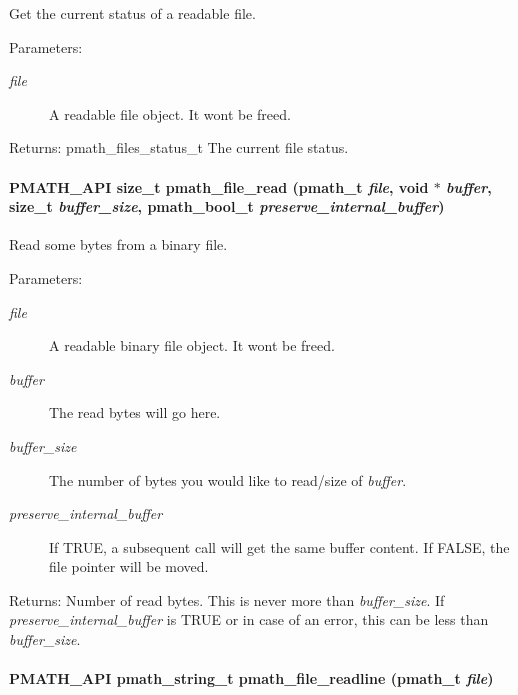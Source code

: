 Get the current status of a readable file. 

\begin{Desc}
\item[Parameters:]
\begin{description}
\item[{\em file}]A readable file object. It wont be freed. \end{description}
\end{Desc}
\begin{Desc}
\item[Returns:]pmath\_\-files\_\-status\_\-t The current file status. \end{Desc}
\hypertarget{group__file__api_g045e5eeb1b78c481c5479fc52ba3a402}{
\paragraph[{pmath\_\-file\_\-read}]{\setlength{\rightskip}{0pt plus 5cm}PMATH\_\-API size\_\-t pmath\_\-file\_\-read ({\bf pmath\_\-t} {\em file}, \/  void $\ast$ {\em buffer}, \/  size\_\-t {\em buffer\_\-size}, \/  {\bf pmath\_\-bool\_\-t} {\em preserve\_\-internal\_\-buffer})}\hfill}
\label{group__file__api_g045e5eeb1b78c481c5479fc52ba3a402}


Read some bytes from a binary file. 

\begin{Desc}
\item[Parameters:]
\begin{description}
\item[{\em file}]A readable binary file object. It wont be freed. \item[{\em buffer}]The read bytes will go here. \item[{\em buffer\_\-size}]The number of bytes you would like to read/size of {\em buffer\/}. \item[{\em preserve\_\-internal\_\-buffer}]If TRUE, a subsequent call will get the same buffer content. If FALSE, the file pointer will be moved. \end{description}
\end{Desc}
\begin{Desc}
\item[Returns:]Number of read bytes. This is never more than {\em buffer\_\-size\/}. If {\em preserve\_\-internal\_\-buffer\/} is TRUE or in case of an error, this can be less than {\em buffer\_\-size\/}. \end{Desc}
\hypertarget{group__file__api_gfe0826b3bb3e06907074976c57a67dbf}{
\paragraph[{pmath\_\-file\_\-readline}]{\setlength{\rightskip}{0pt plus 5cm}PMATH\_\-API {\bf pmath\_\-string\_\-t} pmath\_\-file\_\-readline ({\bf pmath\_\-t} {\em file})}\hfill}
\label{group__file__api_gfe0826b3bb3e06907074976c57a67dbf}


